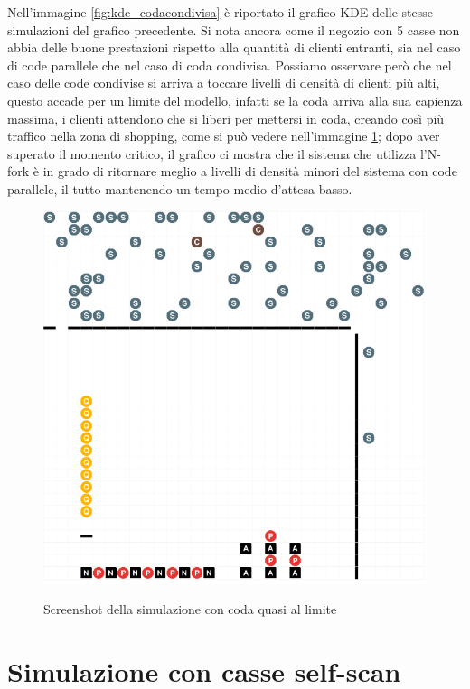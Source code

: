 Nell'immagine \ref{fig:kde_codacondivisa} è riportato il grafico KDE delle stesse simulazioni del grafico precedente. Si nota ancora come il negozio con 5 casse non abbia delle buone prestazioni rispetto alla quantità di clienti entranti, sia nel caso di code parallele che nel caso di coda condivisa. Possiamo osservare però che nel caso delle code condivise si arriva a toccare livelli di densità di clienti più alti, questo accade per un limite del modello, infatti se la coda arriva alla sua capienza massima, i clienti attendono che si liberi per mettersi in coda, creando così più traffico nella zona di shopping, come si può vedere nell'immagine \ref{fig:codacondivisa_screenshot}; dopo aver superato il momento critico, il grafico ci mostra che il sistema che utilizza l'N-fork è in grado di ritornare meglio a livelli di densità minori del sistema con code parallele, il tutto mantenendo un tempo medio d'attesa basso.

\begin{figure}[H]
	\centering
	\includegraphics[width=12cm]{"images/results/codacondivisa_screenshot.png"}
	\label{fig:codacondivisa_screenshot}
	\caption{Screenshot della simulazione con coda quasi al limite}
\end{figure}

\section{Simulazione con casse self-scan}

